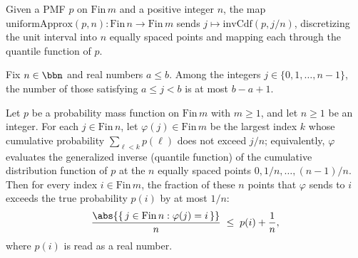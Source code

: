 \begin{definition}
\label{CommunicationComplexity.Internal.uniformApprox}
\leanok
{}
Given a PMF $p$ on $\mathrm{Fin}\,m$ and a positive integer $n$, the map
$\mathrm{uniformApprox}(p, n) : \mathrm{Fin}\,n \to \mathrm{Fin}\,m$ sends
$j \mapsto \mathrm{invCdf}(p, j/n)$, discretizing the unit interval into $n$ equally
spaced points and mapping each through the quantile function of $p$.
\end{definition}

\begin{lemma}
\label{CommunicationComplexity.Internal.card_nat_in_Ico}
\leanok
{}
Fix $n \in \bbn$ and real numbers $a \le b$. Among the integers $j \in \{0, 1, \dots,
n-1\}$, the number of those satisfying $a \le j < b$ is at most $b - a + 1$.
\end{lemma}

\begin{theorem}
\label{CommunicationComplexity.Internal.uniformApprox_approx}
\leanok
{}
Let $p$ be a probability mass function on $\mathrm{Fin}\,m$ with $m \ge 1$, and let $n
\ge 1$ be an integer. For each $j \in \mathrm{Fin}\,n$, let $\varphi(j) \in
\mathrm{Fin}\,m$ be the largest index $k$ whose cumulative probability $\sum_{\ell < k}
p(\ell)$ does not exceed $j/n$; equivalently, $\varphi$ evaluates the generalized
inverse (quantile function) of the cumulative distribution function of $p$ at the $n$
equally spaced points $0, 1/n, \dots, (n-1)/n$. Then for every index $i \in
\mathrm{Fin}\,m$, the fraction of these $n$ points that $\varphi$ sends to $i$ exceeds
the true probability $p(i)$ by at most $1/n$:
\[
  \frac{\abs{\{\, j \in \mathrm{Fin}\,n : \varphi(j) = i \,\}}}{n}
  \;\le\; p(i) + \frac{1}{n},
\]
where $p(i)$ is read as a real number.
\end{theorem}

